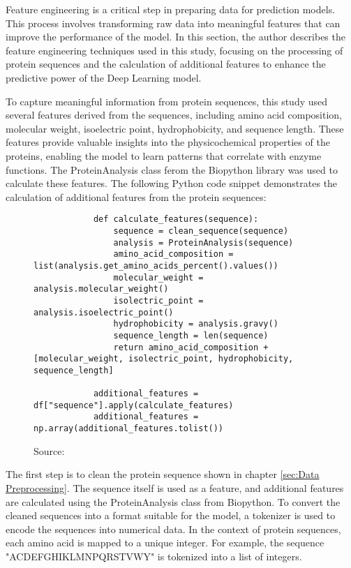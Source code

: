 Feature engineering is a critical step in preparing data for prediction models. This process involves transforming raw data into meaningful features that can improve the performance of the model. In this section, the author describes the feature engineering techniques used in this study, focusing on the processing of protein sequences and the calculation of additional features to enhance the predictive power of the Deep Learning model.

To capture meaningful information from protein sequences, this study used several features derived from the sequences, including amino acid composition, molecular weight, isoelectric point, hydrophobicity, and sequence length. These features provide valuable insights into the physicochemical properties of the proteins, enabling the model to learn patterns that correlate with enzyme functions. The ProteinAnalysis class ferom the Biopython library was used to calculate these features. The following Python code snippet demonstrates the calculation of additional features from the protein sequences:

\begin{figure}[bht]
    \begin{lstlisting}
            def calculate_features(sequence):
                sequence = clean_sequence(sequence)
                analysis = ProteinAnalysis(sequence)
                amino_acid_composition = list(analysis.get_amino_acids_percent().values())
                molecular_weight = analysis.molecular_weight()
                isolectric_point = analysis.isoelectric_point()
                hydrophobicity = analysis.gravy()
                sequence_length = len(sequence)
                return amino_acid_composition + [molecular_weight, isolectric_point, hydrophobicity, sequence_length]
    
            additional_features = df["sequence"].apply(calculate_features)
            additional_features = np.array(additional_features.tolist())
\end{lstlisting}
\caption{Source: \autocite{polleyTobiasPolDeepZyme2024}}
\end{figure}

The first step is to clean the protein sequence shown in chapter \ref{sec:Data Preprocessing}. The sequence itself is used as a feature, and additional features are calculated using the ProteinAnalysis class from Biopython. To convert the cleaned sequences into a format suitable for the model, a tokenizer is used to encode the sequences into numerical data. In the context of protein sequences, each amino acid is mapped to a unique integer. For example, the sequence "ACDEFGHIKLMNPQRSTVWY" is tokenized into a list of integers. 

